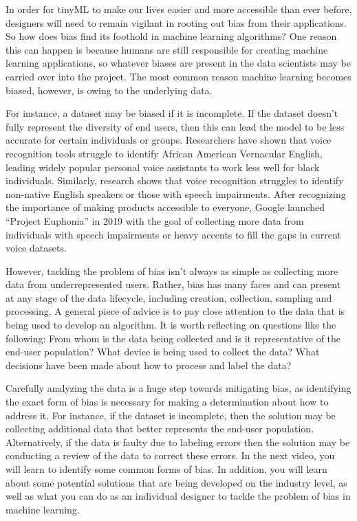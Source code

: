 In order for tinyML to make our lives easier and more accessible than ever before, designers will need to remain vigilant in rooting out bias from their applications. So how does bias find its foothold in machine learning algorithms? One reason this can happen is because humans are still responsible for creating machine learning applications, so whatever biases are present in the data scientists may be carried over into the project. The most common reason machine learning becomes biased, however, is owing to the underlying data. 

For instance, a dataset may be biased if it is incomplete. If the dataset doesn’t fully represent the diversity of end users, then this can lead the model to be less accurate for certain individuals or groups. Researchers have shown that voice recognition tools struggle to identify African American Vernacular English, leading widely popular personal voice assistants to work less well for black individuals. Similarly, research shows that voice recognition struggles to identify non-native English speakers or those with speech impairments. After recognizing the importance of making products accessible to everyone, Google launched “Project Euphonia” in 2019 with the goal of collecting more data from individuals with speech impairments or heavy accents to fill the gaps in current voice datasets. 

However, tackling the problem of bias isn’t always as simple as collecting more data from underrepresented users. Rather, bias has many faces and can present at any stage of the data lifecycle, including creation, collection, sampling and processing. A general piece of advice is to pay close attention to the data that is being used to develop an algorithm. It is worth reflecting on questions like the following: From whom is the data being collected and is it representative of the end-user population? What device is being used to collect the data? What decisions have been made about how to process and label the data?

Carefully analyzing the data is a huge step towards mitigating bias, as identifying the exact form of bias is necessary for making a determination about how to address it. For instance, if the dataset is incomplete, then the solution may be collecting additional data that better represents the end-user population. Alternatively, if the data is faulty due to labeling errors then the solution may be conducting a review of the data to correct these errors. In the next video, you will learn to identify some common forms of bias. In addition, you will learn about some potential solutions that are being developed on the industry level, as well as what you can do as an individual designer to tackle the problem of bias in machine learning.

